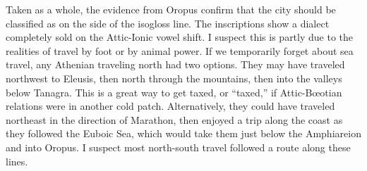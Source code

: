 Taken as a whole,
the evidence from Oropus confirm that the city should be classified as on the  side of the isogloss line.
The inscriptions show a dialect completely sold on the Attic-Ionic vowel shift.
I suspect this is partly due to the realities of travel by foot or by animal power.
If we temporarily forget about sea travel,
any Athenian traveling north had two options.
They may have traveled northwest to Eleusis,
then north through the mountains,
then into the valleys below Tanagra.
This is a great way to get taxed,
or ``taxed,''
if Attic-Bœotian relations were in another cold patch.
Alternatively,
they could have traveled northeast in the direction of Marathon,
then enjoyed a trip along the coast as they followed the Euboic Sea,
which would take them just below the Amphiareion and into Oropus.
I suspect most north-south travel followed a route along these lines.
